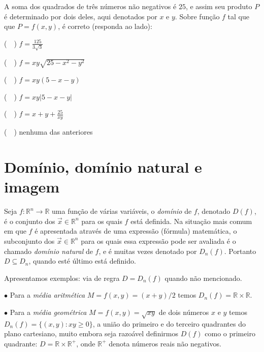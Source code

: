 \noindent
\begin{minipage}{9cm}
\begin{exer}
A soma dos quadrados de três números não negativos é $25$, e assim  seu produto  $P$ é determinado por dois deles, aqui denotados por $x$ e $y$. 
Sobre função $f$ tal que que $ P = f(x,y)$, é correto (responda ao lado):
\end{exer}
\end{minipage}
\begin{minipage}{6cm}

(~~) $f = \frac{125}{3\sqrt{3}}  $

(~~)  $f = xy\sqrt{25 - x^2 - y^2} $

(~~)  $f = xy(5 - x- y) $

(~~)  $f = xy |5 - x - y| $

(~~)  $f = x + y + \frac{25}{xy}$

(~~) nenhuma das anteriores
\end{minipage}


\section{Domínio, domínio natural e imagem}
\label{sec:intro_ddnim}

Seja $f : \mathbb{R}^n \rightarrow \mathbb{R}$ uma função de várias variáveis, o {\it domínio} de $f$, denotado $D(f)$,  é o conjunto dos  $\vec{x} \in \mathbb{R}^n$ para os quais $f$ está definida. Na situação mais comum  em que $f$ é apresentada através de uma expressão (fórmula) matemática, o subconjunto dos $\vec{x} \in \mathbb{R}^n$ para os quais essa expressão pode ser avaliada é o chamado {\it domínio natural} de $f$, e é muitas vezes denotado por $D_n(f)$. Portanto $D \subseteq D_n$, quando esté último está definido.

Apresentamos exemplos: via de regra $D = D_n(f)$ quando não mencionado. 

\medskip

$\bullet$ Para a {\it média aritmética} $M=f(x,y)=(x+y)/2$ temos $D_n(f) = \mathbb{R} \times \mathbb{R}$. 

\medskip

$\bullet$ Para a  {\it média geométrica} $M=f(x,y) = \sqrt{x y} $ de dois números $x$ e $y$  temos $D_n(f) = \{(x,y) : xy \geq 0\}$, a união do primeiro e do terceiro quadrantes do plano cartesiano, muito embora seja razoável definirmos $D(f)$ como o primeiro quadrante: $D = \mathbb{R} \times \mathbb{R}^{+}$, onde $\mathbb{R}^{+}$ denota números reais não negativos.

